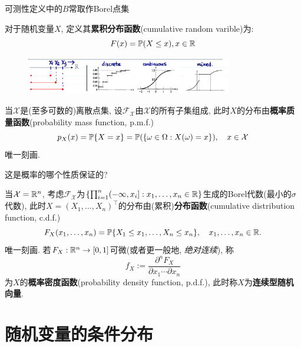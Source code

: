 \begin{remark}
    可测性定义中的$B$常取作Borel点集
\end{remark}

\begin{definition}[累积分布函数]
    对于随机变量$X$, 定义其\textbf{累积分布函数}(cumulative random varible)为:
    \[ F(x)= \P(X \le  x), x \in \R \]
\end{definition}

\begin{figure}[h]
    \centering
    \includegraphics[width=0.8\textwidth]{image/cdf.png}
\end{figure}

\begin{definition}[概率质量函数]
    当$\mathcal{X}$是(至多可数的)离散点集, 设$\mathscr{F}_{\mathcal{X}}$由$\mathcal{X}$的所有子集组成, 此时$X$的分布由\textbf{概率质量函数}(probability mass function, p.m.f.)
    \[ p_{X}(x) = \P\{X=x\} = \P(\{\omega\in\Omega:X(\omega)=x\}), \quad x\in\mathcal{X} \]
    唯一刻画.
\end{definition}

\begin{remark}
    这是概率的哪个性质保证的?
\end{remark}

\begin{definition}
    当$\mathcal{X} = \R^{n}$, 考虑$\mathscr{F}_{\mathcal{X}}$为$\left\{\prod_{i=1}^{n}(-\infty,x_{i}] : x_{1},\dots,x_{n}\in\R\right\}$生成的Borel代数(最小的$\sigma$代数), 此时$X = (X_{1},\dots,X_{n})^{\top}$的分布由(累积)\textbf{分布函数}(cumulative distribution function, c.d.f.)
    \[ F_{X}(x_{1},\dots,x_{n}) = \P\{X_{1}\leq x_{1},\dots, X_{n}\leq x_{n}\}, \quad x_{1},\dots,x_{n}\in\R. \]
    唯一刻画. 若$F_{X} : \R^{n} \to [0,1]$可微(或者更一般地, \emph{绝对连续}), 称
    \[ f_{X} := \frac{\partial^{n} F_{X}}{\partial x_{1} \cdots \partial x_{n}} \]
    为$X$的\textbf{概率密度函数}(probability density function, p.d.f.), 此时称$X$为\textbf{连续型随机向量}.
\end{definition}

\section{随机变量的条件分布}

